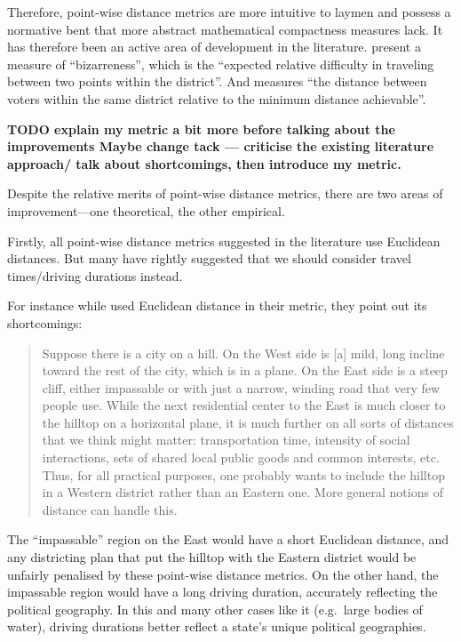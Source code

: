 \documentclass[]{article}
\begin{document}
Therefore, point-wise distance metrics are more intuitive to laymen and
possess a normative bent that more abstract mathematical compactness
measures lack. It has therefore been an active area of development in
the literature. \cite{cm2010} present a measure of ``bizarreness'',
which is the ``expected relative difficulty in traveling between two
points within the district''. And \cite{fh2011} measures ``the distance
between voters within the same district relative to the minimum distance
achievable''.

\textbf{TODO explain my metric a bit more before talking about the
improvements Maybe change tack --- criticise the existing literature
approach/ talk about shortcomings, then introduce my metric.}

Despite the relative merits of point-wise distance metrics, there are
two areas of improvement---one theoretical, the other empirical.

Firstly, all point-wise distance metrics suggested in the literature use
Euclidean distances. But many have rightly suggested that we should
consider travel times/driving durations instead.

For instance while \cite{fh2011} used Euclidean distance in their
metric, they point out its shortcomings:

\begin{quote}
Suppose there is a city on a hill. On the West side is {[}a{]} mild,
long incline toward the rest of the city, which is in a plane. On the
East side is a steep cliff, either impassable or with just a narrow,
winding road that very few people use. While the next residential center
to the East is much closer to the hilltop on a horizontal plane, it is
much further on all sorts of distances that we think might matter:
transportation time, intensity of social interactions, sets of shared
local public goods and common interests, etc. Thus, for all practical
purposes, one probably wants to include the hilltop in a Western
district rather than an Eastern one. More general notions of distance
can handle this.
\end{quote}

The ``impassable'' region on the East would have a short Euclidean
distance, and any districting plan that put the hilltop with the Eastern
district would be unfairly penalised by these point-wise distance
metrics. On the other hand, the impassable region would have a long
driving duration, accurately reflecting the political geography. In this
and many other cases like it (e.g.~large bodies of water), driving
durations better reflect a state's unique political geographies.
\end{document}
